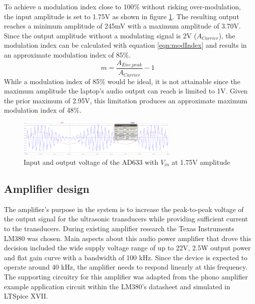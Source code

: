 To achieve a modulation index close to 100\% without risking over-modulation, the input amplitude is set to 1.75V as shown in figure \ref{fig:mixervin175}. The resulting output reaches a minimum amplitude of 245mV with a maximum amplitude of 3.70V. Since the output amplitude without a modulating signal is 2V ($A_{Carrier}$), the modulation index can be calculated with equation \ref{eqn:modIndex} and results in an approximate modulation index of 85\%.
\begin{equation}\label{eqn:modIndex}
    m = \frac{A_{Env\_peak}}{A_{Carrier}} - 1
\end{equation}
While a modulation index of 85\% would be ideal, it is not attainable since the maximum amplitude the laptop's audio output can reach is limited to 1V. Given the prior maximum of 2.95V, this limitation produces an approximate maximum modulation index of 48\%.
\begin{figure}[ht!]
    \centering
    \includegraphics[width=0.7\textwidth]{Figures/Design/Mixer/175Vm10Vc.png}
    \caption{Input and output voltage of the AD633 with $V_{in}$ at 1.75V amplitude}
    \label{fig:mixervin175}
\end{figure}


\newpage
\subsection{Amplifier design}
The amplifier's purpose in the system is to increase the peak-to-peak voltage of the output signal for the ultrasonic transducers while providing sufficient current to the transducers. During existing amplifier research the Texas Instruments LM380 was chosen. Main aspects about this audio power amplifier that drove this decision included the wide supply voltage range of up to 22V, 2.5W output power and flat gain curve with a bandwidth of 100 kHz. Since the device is expected to operate around 40 kHz, the amplifier needs to respond linearly at this frequency.\\
The supporting circuitry for this amplifier was adapted from the phono amplifier example application circuit within the LM380's datasheet and simulated in LTSpice XVII.

